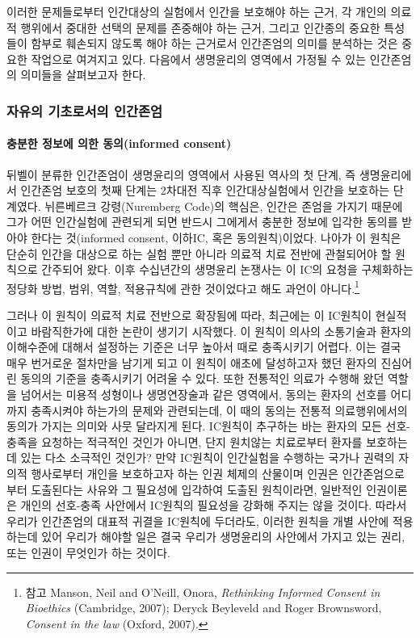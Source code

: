 이러한 문제들로부터 인간대상의 실험에서 인간을 보호해야 하는 근거, 각 개인의 의료적 행위에서 중대한 선택의 문제를 존중해야 하는 근거, 그리고 인간종의 중요한 특성들이 함부로 훼손되지 않도록 해야 하는 근거로서 인간존엄의 의미를 분석하는 것은 중요한 작업으로 여겨지고 있다. 다음에서 생명윤리의 영역에서 가정될 수 있는 인간존엄의 의미들을 살펴보고자 한다.

\subsubsection{자유의 기초로서의 인간존엄}

\paragraph{충분한 정보에 의한 동의(informed consent)}

뒤벨이 분류한 인간존엄이 생명윤리의 영역에서 사용된 역사의 첫 단계, 즉 생명윤리에서 인간존엄 보호의 첫째 단계는 2차대전 직후 인간대상실험에서 인간을 보호하는 단계였다. 뉘른베르크 강령(Nuremberg Code)의 핵심은, 인간은 존엄을 가지기 때문에 그가 어떤 인간실험에 관련되게 되면 반드시 그에게서 충분한 정보에 입각한 동의를 받아야 한다는 것(informed consent, 이하IC, 혹은 동의원칙)이었다. 나아가 이 원칙은 단순히 인간을 대상으로 하는 실험 뿐만 아니라 의료적 치료 전반에 관철되어야 할 원칙으로 간주되어 왔다. 이후 수십년간의 생명윤리 논쟁사는 이 IC의 요청을 구체화하는 정당화 방법, 범위, 역할, 적용규칙에 관한 것이었다고 해도 과언이 아니다.\footnote{참고 Manson, Neil and O'Neill, Onora, \emph{Rethinking Informed Consent in Bioethics} (Cambridge, 2007); Deryck Beyleveld and Roger Brownsword, \emph{Consent in the law} (Oxford, 2007).}

그러나 이 원칙이 의료적 치료 전반으로 확장됨에 따라, 최근에는 이 IC원칙이 현실적이고 바람직한가에 대한 논란이 생기기 시작했다. 이 원칙이 의사의 소통기술과 환자의 이해수준에 대해서 설정하는 기준은 너무 높아서 때로 충족시키기 어렵다. 이는 결국 매우 번거로운 절차만을 남기게 되고 이 원칙이 애초에 달성하고자 했던 환자의 진심어린 동의의 기준을 충족시키기 어려울 수 있다. 또한 전통적인 의료가 수행해 왔던 역할을 넘어서는 미용적 성형이나 생명연장술과 같은 영역에서, 동의는 환자의 선호를 어디까지 충족시켜야 하는가의 문제와 관련되는데, 이 때의 동의는 전통적 의료행위에서의 동의가 가지는 의미와 사뭇 달라지게 된다. IC원칙이 추구하는 바는 환자의 모든 선호-충족을 요청하는 적극적인 것인가 아니면, 단지 원치않는 치료로부터 환자를 보호하는 데 있는 다소 소극적인 것인가? 만약 IC원칙이 인간실험을 수행하는 국가나 권력의 자의적 행사로부터 개인을 보호하고자 하는 인권 체제의 산물이며 인권은 인간존엄으로부터 도출된다는 사유와 그 필요성에 입각하여 도출된 원칙이라면, 일반적인 인권이론은 개인의 선호-충족 사안에서 IC원칙의 필요성을 강화해 주지는 않을 것이다. 따라서 우리가 인간존엄의 대표적 귀결을 IC원칙에 두더라도, 이러한 원칙을 개별 사안에 적용하는데 있어 우리가 해야할 일은 결국 우리가 생명윤리의 사안에서 가지고 있는 권리, 또는 인권이 무엇인가 하는 것이다.

